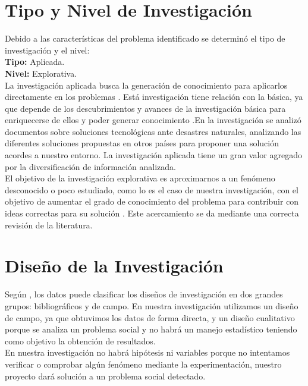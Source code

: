 \documentclass[11pt,openany]{book}
\begin{document}
	\section{Tipo y Nivel de Investigación}
	Debido a las características del problema identificado se determinó el tipo de investigación y el nivel:\\[0.25cm]
	\textbf{Tipo: }Aplicada. \\
	\textbf{Nivel: }Explorativa. \\ [0.25 cm]
	La investigación aplicada busca la generación de conocimiento para aplicarlos directamente en los problemas \cite{lozada2014}. Está investigación tiene relación con la básica, ya que  depende de los descubrimientos y avances de la investigación básica para enriquecerse de ellos y poder generar conocimiento \cite{grajales2000}.En la investigación se analizó documentos sobre soluciones tecnológicas ante desastres naturales, analizando las diferentes soluciones propuestas en otros países para proponer una solución acordes a nuestro entorno. La investigación aplicada tiene un gran valor agregado por la diversificación de información analizada.\\ [0.25 cm]
	El objetivo de la investigación explorativa es aproximarnos a un fenómeno desconocido o poco estudiado, como lo es el caso de nuestra investigación,  con el objetivo de aumentar el grado de conocimiento del problema para contribuir con ideas correctas para su solución \cite{grajales2000}. Este acercamiento se da mediante una correcta revisión de la literatura. \\

	\section{Diseño de la Investigación}
	Según \cite{sabino}, los datos puede clasificar los diseños de investigación en dos grandes grupos: bibliográficos y de campo. En nuestra investigación utilizamos un diseño de campo, ya que obtuvimos los datos de forma directa, y un diseño cualitativo porque se analiza un problema social y no habrá un manejo  estadístico teniendo como objetivo la obtención de resultados.\\
	En nuestra investigación no habrá hipótesis ni variables porque no intentamos verificar o comprobar algún fenómeno mediante la experimentación, nuestro proyecto dará solución a un problema social detectado.
	\newpage
\end{document}

